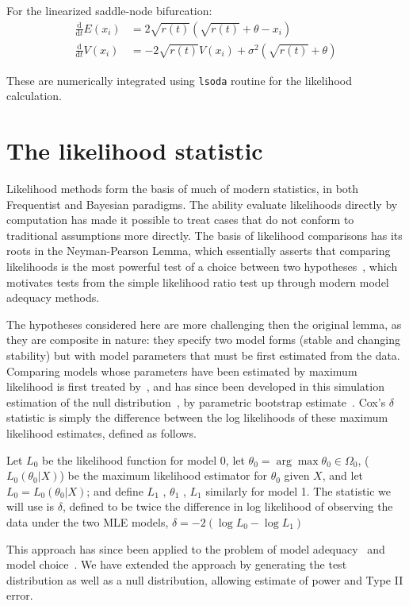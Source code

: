 \documentclass[authoryear, preprint,review,12pt]{elsarticle}
\newcommand{\ud}{\mathrm{d}}
\begin{document}
For the linearized saddle-node bifurcation:
\begin{align}
\frac{\ud }{\ud t} E(x_i)&=  2\sqrt{r(t)}(\sqrt{r(t)}+\theta - x_i) \\
\frac{\ud}{\ud t} V(x_i) &=  -2 \sqrt{r(t)} V(x_i) + \sigma^2 ( \sqrt{r(t)}+\theta )
\label{LSNsoln}
\end{align}

These are numerically integrated using \texttt{lsoda} routine for the likelihood calculation.  

\section{The likelihood statistic}
Likelihood methods form the basis of much of modern statistics, in both Frequentist and Bayesian paradigms.  
The ability evaluate likelihoods directly by computation has made it possible to treat cases that do not conform to traditional assumptions more directly.
The basis of likelihood comparisons has its roots in the Neyman-Pearson Lemma, 
which essentially asserts that comparing likelihoods is the most powerful test
of a choice between two hypotheses~\citep{Neyman1933}, which motivates
tests from the simple likelihood ratio test up through modern model adequacy methods.

The hypotheses considered here are more challenging then the original lemma, as they are composite in nature:
they specify two model forms (stable and changing stability)
but with model parameters that must be first estimated from the data.
Comparing models whose parameters have been estimated by maximum likelihood is first treated by~\citet{Cox1961, Cox1962},
and has since been developed in this simulation estimation of the null distribution~\citep{McLachlan1987}, by parametric bootstrap estimate~\citep{Efron1987}.  
Cox's $\delta$ statistic is simply the difference between the log likelihoods of these maximum likelihood estimates, defined as follows.

Let $L_0$ be the likelihood function for model 0, let $\theta_0 = \arg \max \theta_0 \in \Omega_0$, ($L_0 (\theta_0 |X)$) be the maximum likelihood estimator for $\theta_0$ given $X$, and let $L_0 = L_0 (\theta_0 |X)$; and define $L_1$ , $\theta_1$ , $L_1$ similarly for model 1. The statistic we will use is $\delta$, defined to be twice the difference in log likelihood of observing the data under the two MLE models,
$\delta = -2 (\log L_0 - \log L_1 )$

This approach has since been applied to the problem of model adequacy~\citep{Goldman1993} and model choice~\citep{Huelsenbeck1996}.  
We have extended the approach by generating the test distribution as well as a null distribution, allowing estimate of power and Type II error.  
\end{document}
